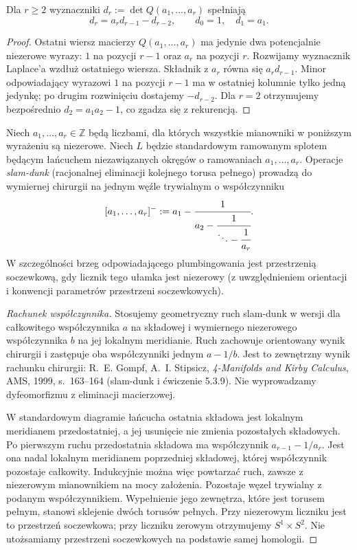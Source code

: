 \begin{lemat}
\label{lem:tg-plumbing-chain-det}
Dla $r\ge2$ wyznaczniki
$d_r:=\det Q(a_1,\dots,a_r)$ spełniają
\[
d_r=a_r d_{r-1}-d_{r-2},\qquad
 d_0=1,\quad d_1=a_1.
\]
\end{lemat}
\begin{proof}
Ostatni wiersz macierzy $Q(a_1,\dots,a_r)$ ma
jedynie dwa potencjalnie niezerowe wyrazy: $1$ na pozycji
$r-1$ oraz $a_r$ na pozycji $r$. Rozwijamy wyznacznik
Laplace'a wzdłuż ostatniego wiersza. Składnik z $a_r$
równa się $a_r d_{r-1}$. Minor odpowiadający wyrazowi $1$
na pozycji $r-1$ ma w ostatniej kolumnie tylko jedną
jedynkę; po drugim rozwinięciu dostajemy $-d_{r-2}$.
Dla $r=2$ otrzymujemy bezpośrednio
$d_2=a_1a_2-1$, co zgadza się z rekurencją.
\end{proof}

\begin{stwierdzenie}
\label{st:tg-plumbing-chain-surgery}
Niech $a_1,\dots,a_r\in\mathbb Z$ będą liczbami,
dla których wszystkie mianowniki w poniższym wyrażeniu
są niezerowe. Niech $L$ będzie standardowym ramowanym
splotem będącym łańcuchem niezawiązanych okręgów o
ramowaniach $a_1,\dots,a_r$. Operacje \emph{slam-dunk}
(racjonalnej eliminacji kolejnego torusa pełnego)
prowadzą do wymiernej chirurgii na jednym węźle trywialnym
o współczynniku
\[
[a_1,\dots,a_r]^-:=a_1-\cfrac1{a_2-
\cfrac1{\ddots-\cfrac1{a_r}}}.
\]
W szczególności brzeg odpowiadającego plumbingowania
jest przestrzenią soczewkową, gdy licznik tego ułamka
jest niezerowy (z uwzględnieniem orientacji i konwencji
parametrów przestrzeni soczewkowych).
\end{stwierdzenie}

\begin{proof}[Rachunek współczynnika]
Stosujemy geometryczny ruch slam-dunk w wersji
dla całkowitego współczynnika $a$ na składowej
i wymiernego niezerowego współczynnika $b$ na
jej lokalnym meridianie. Ruch zachowuje
orientowany wynik chirurgii i zastępuje oba
współczynniki jednym $a-1/b$.
Jest to zewnętrzny wynik rachunku chirurgii:
R.~E. Gompf, A.~I. Stipsicz,
\emph{4-Manifolds and Kirby Calculus}, AMS, 1999,
s.~163--164 (slam-dunk i ćwiczenie 5.3.9).
Nie wyprowadzamy dyfeomorfizmu z eliminacji
macierzowej.

W standardowym diagramie łańcucha ostatnia
składowa jest lokalnym meridianem przedostatniej,
a jej usunięcie nie zmienia pozostałych składowych.
Po pierwszym ruchu przedostatnia składowa ma
współczynnik $a_{r-1}-1/a_r$. Jest ona nadal
lokalnym meridianem poprzedniej składowej,
której współczynnik pozostaje całkowity.
Indukcyjnie można więc powtarzać ruch,
zawsze z niezerowym mianownikiem na mocy założenia.
Pozostaje węzeł trywialny z podanym
współczynnikiem. Wypełnienie jego zewnętrza,
które jest torusem pełnym, stanowi sklejenie
dwóch torusów pełnych. Przy niezerowym liczniku
jest to przestrzeń soczewkowa; przy liczniku
zerowym otrzymujemy $S^1\times S^2$.
Nie utożsamiamy przestrzeni soczewkowych
na podstawie samej homologii.
\end{proof}

